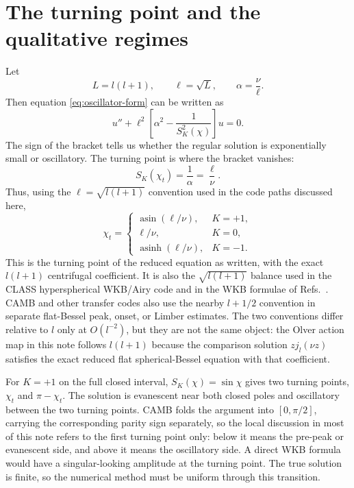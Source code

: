 \documentclass[11pt,a4paper]{article}
\newcommand{\SK}{S_K}
\newcommand{\asinh}{\operatorname{asinh}}
\newcommand{\asin}{\operatorname{asin}}
\begin{document}
\section{The turning point and the qualitative regimes}

Let
\begin{equation}
  L=l(l+1),\qquad \ell=\sqrt{L},\qquad \alpha=\frac{\nu}{\ell}.
\end{equation}
Then equation \eqref{eq:oscillator-form} can be written as
\begin{equation}
  u''+\ell^2\left[\alpha^2-\frac{1}{\SK^2(\chi)}\right]u=0.
\end{equation}
The sign of the bracket tells us whether the regular solution is exponentially small or oscillatory.  The turning point is where the bracket vanishes:
\begin{equation}
  \SK(\chi_t)=\frac{1}{\alpha}=\frac{\ell}{\nu}.
  \label{eq:turning-condition}
\end{equation}
Thus, using the \(\ell=\sqrt{l(l+1)}\) convention used in the code paths discussed here,
\begin{equation}
  \chi_t=
  \begin{cases}
    \asin(\ell/\nu), & K=+1,\\
    \ell/\nu, & K=0,\\
    \asinh(\ell/\nu), & K=-1.
  \end{cases}
  \label{eq:turning-chi}
\end{equation}
This is the turning point of the reduced equation as written, with the exact
\(l(l+1)\) centrifugal coefficient.  It is also the
\(\sqrt{l(l+1)}\) balance used in the \textsc{CLASS} hyperspherical WKB/Airy
code and in the WKB formulae of Refs.~\cite{kosowsky1998,tram2013}.  CAMB and
other transfer codes also use the nearby \(l+1/2\) convention in separate
flat-Bessel peak, onset, or Limber estimates.  The two conventions differ
relative to \(l\) only at \(O(l^{-2})\), but they are not the same object: the
Olver action map in this note follows \(l(l+1)\) because the comparison solution
\(zj_l(\nu z)\) satisfies the exact reduced flat spherical-Bessel equation with
that coefficient.

For \(K=+1\) on the full closed interval, \(\SK(\chi)=\sin\chi\) gives two
turning points, \(\chi_t\) and \(\pi-\chi_t\).  The solution is evanescent near
both closed poles and oscillatory between the two turning points.  CAMB folds
the argument into \([0,\pi/2]\), carrying the corresponding parity sign
separately, so the local discussion in most of this note refers to the first
turning point only: below it means the pre-peak or evanescent side, and above it
means the oscillatory side.  A direct WKB formula would have a singular-looking
amplitude at the turning point.  The true solution is finite, so the numerical
method must be uniform through this transition.
\end{document}
